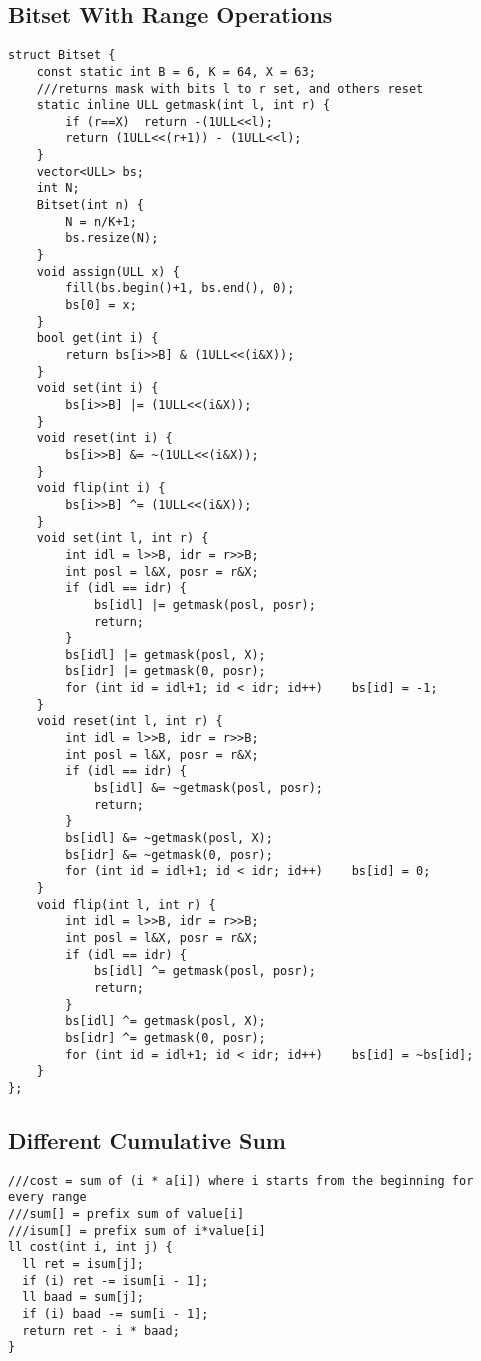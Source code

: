 \documentclass[10pt,a4paper,onesided]{article}
\begin{document}
\begin{multicols*}{3}
\subsection{Bitset With Range Operations}
\begin{lstlisting}
struct Bitset {
    const static int B = 6, K = 64, X = 63;
    ///returns mask with bits l to r set, and others reset
    static inline ULL getmask(int l, int r) {
        if (r==X)  return -(1ULL<<l);
        return (1ULL<<(r+1)) - (1ULL<<l);
    }
    vector<ULL> bs;
    int N;
    Bitset(int n) {
        N = n/K+1;
        bs.resize(N);
    }
    void assign(ULL x) {
        fill(bs.begin()+1, bs.end(), 0);
        bs[0] = x;
    }
    bool get(int i) {
        return bs[i>>B] & (1ULL<<(i&X));
    }
    void set(int i) {
        bs[i>>B] |= (1ULL<<(i&X));
    }
    void reset(int i) {
        bs[i>>B] &= ~(1ULL<<(i&X));
    }
    void flip(int i) {
        bs[i>>B] ^= (1ULL<<(i&X));
    }
    void set(int l, int r) {
        int idl = l>>B, idr = r>>B;
        int posl = l&X, posr = r&X;
        if (idl == idr) {
            bs[idl] |= getmask(posl, posr);
            return;
        }
        bs[idl] |= getmask(posl, X);
        bs[idr] |= getmask(0, posr);
        for (int id = idl+1; id < idr; id++)    bs[id] = -1;
    }
    void reset(int l, int r) {
        int idl = l>>B, idr = r>>B;
        int posl = l&X, posr = r&X;
        if (idl == idr) {
            bs[idl] &= ~getmask(posl, posr);
            return;
        }
        bs[idl] &= ~getmask(posl, X);
        bs[idr] &= ~getmask(0, posr);
        for (int id = idl+1; id < idr; id++)    bs[id] = 0;
    }
    void flip(int l, int r) {
        int idl = l>>B, idr = r>>B;
        int posl = l&X, posr = r&X;
        if (idl == idr) {
            bs[idl] ^= getmask(posl, posr);
            return;
        }
        bs[idl] ^= getmask(posl, X);
        bs[idr] ^= getmask(0, posr);
        for (int id = idl+1; id < idr; id++)    bs[id] = ~bs[id];
    }
};

\end{lstlisting}
\subsection{Different Cumulative Sum}
\begin{lstlisting}
///cost = sum of (i * a[i]) where i starts from the beginning for every range
///sum[] = prefix sum of value[i]
///isum[] = prefix sum of i*value[i]
ll cost(int i, int j) {
  ll ret = isum[j];
  if (i) ret -= isum[i - 1];
  ll baad = sum[j];
  if (i) baad -= sum[i - 1];
  return ret - i * baad;
} 
\end{lstlisting}

\end{multicols*}
\end{document}
